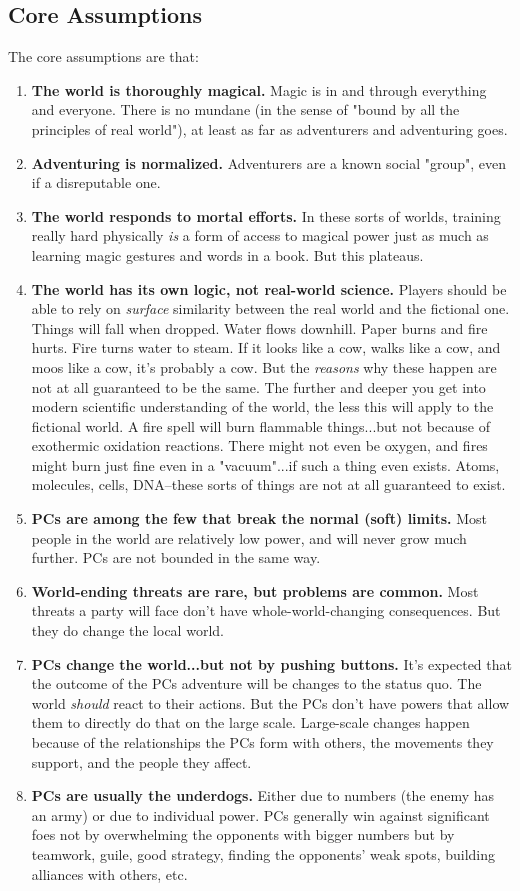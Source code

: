 \subsection{Core Assumptions}
The core assumptions are that:
\begin{enumerate}
\item \textbf{The world is thoroughly magical.} Magic is in and through everything and everyone. There is no mundane (in the sense of "bound by all the principles of real world"), at least as far as adventurers and adventuring goes.
\item \textbf{Adventuring is normalized.} Adventurers are a known social "group", even if a disreputable one.
\item \textbf{The world responds to mortal efforts.} In these sorts of worlds, training really hard physically \textit{is} a form of access to magical power just as much as learning magic gestures and words in a book. But this plateaus.
\item \textbf{The world has its own logic, not real-world science.} Players should be able to rely on \textit{surface} similarity between the real world and the fictional one. Things will fall when dropped. Water flows downhill. Paper burns and fire hurts. Fire turns water to steam. If it looks like a cow, walks like a cow, and moos like a cow, it's probably a cow. But the \textit{reasons} why these happen are not at all guaranteed to be the same. The further and deeper you get into modern scientific understanding of the world, the less this will apply to the fictional world. A fire spell will burn flammable things...but not because of exothermic oxidation reactions. There might not even be oxygen, and fires might burn just fine even in a "vacuum"...if such a thing even exists. Atoms, molecules, cells, DNA--these sorts of things are not at all guaranteed to exist.
\item \textbf{PCs are among the few that break the normal (soft) limits.} Most people in the world are relatively low power, and will never grow much further. PCs are not bounded in the same way.
\item \textbf{World-ending threats are rare, but problems are common.} Most threats a party will face don't have whole-world-changing consequences. But they do change the local world.
\item \textbf{PCs change the world...but not by pushing buttons.} It's expected that the outcome of the PCs adventure will be changes to the status quo. The world \textit{should} react to their actions. But the PCs don't have powers that allow them to directly do that on the large scale. Large-scale changes happen because of the relationships the PCs form with others, the movements they support, and the people they affect.
\item \textbf{PCs are usually the underdogs.} Either due to numbers (the enemy has an army) or due to individual power. PCs generally win against significant foes not by overwhelming the opponents with bigger numbers but by teamwork, guile, good strategy, finding the opponents' weak spots, building alliances with others, etc. 
\end{enumerate}

